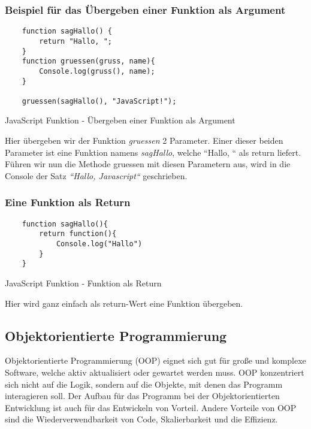 \subsubsection{Beispiel für das Übergeben einer Funktion als Argument}
\begin{code}[htp]
\begin{lstlisting}
    function sagHallo() {
        return "Hallo, ";
    }
    function gruessen(gruss, name){
        Console.log(gruss(), name);
    }

    gruessen(sagHallo(), "JavaScript!");
\end{lstlisting}
\caption{JavaScript Funktion - Übergeben einer Funktion als Argument}
\end{code}
Hier übergeben wir der Funktion \textit{gruessen} 2 Parameter. Einer dieser beiden Parameter ist eine
Funktion namens \textit{sagHallo}, welche ``Hallo, `` als return liefert. Führen wir nun 
die Methode gruessen mit diesen Parametern aus, wird in die Console der Satz 
\textit{``Hallo, Javascript``} geschrieben.

\subsubsection{Eine Funktion als Return}
\begin{code}[htp]
\begin{lstlisting}
    function sagHallo(){
        return function(){
            Console.log("Hallo")
        }
    }
\end{lstlisting}
\caption{JavaScript Funktion - Funktion als Return}
\end{code}
Hier wird ganz einfach als return-Wert eine Funktion übergeben.

\subsection{Objektorientierte Programmierung}
Objektorientierte Programmierung (OOP) eignet sich gut für große und komplexe Software, welche aktiv 
aktualisiert oder gewartet werden muss. OOP konzentriert sich nicht auf die Logik, sondern auf die 
Objekte, mit denen das Programm interagieren soll. Der Aufbau für das Programm bei der 
Objektorientierten Entwicklung ist auch für das Entwickeln von Vorteil. Andere Vorteile von OOP 
sind die Wiederverwendbarkeit von Code, Skalierbarkeit und die Effizienz.~\cite{OOP}

